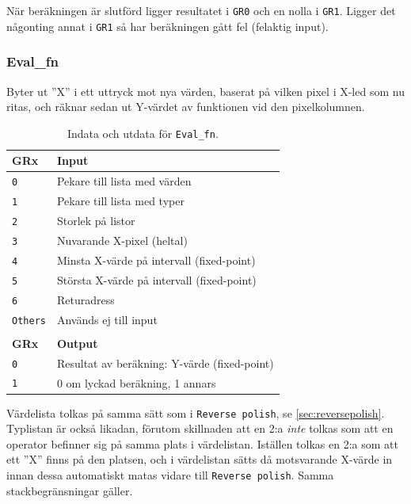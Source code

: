 \documentclass[]{article}
\begin{document}
När beräkningen är slutförd ligger resultatet i \texttt{GR0} och en nolla i \texttt{GR1}. Ligger det någonting annat i \texttt{GR1} så har beräkningen gått fel (felaktig input).

\subsubsection{Eval\_fn}
\label{sec:evalfn}

Byter ut ''X'' i ett uttryck mot nya värden, baserat på vilken pixel i X-led som nu ritas, och räknar sedan ut Y-värdet av funktionen vid den pixelkolumnen.

\begin{table}[H]
\centering
\begin{tabular}{ll}
	\textbf{GRx}    & \textbf{Input}               \\ \hline
	\texttt{0}      & Pekare till lista med värden \\
	\texttt{1}      & Pekare till lista med typer  \\
	\texttt{2}      & Storlek på listor            \\
	\texttt{3}      & Nuvarande X-pixel (heltal)   \\
	\texttt{4}      & Minsta X-värde på intervall (fixed-point) \\
	\texttt{5}      & Största X-värde på intervall (fixed-point) \\
        \texttt{6}      & Returadress                  \\
        \texttt{Others} & Används ej till input        \\
                        &                              \\
	\textbf{GRx}    & \textbf{Output}              \\ \hline
	\texttt{0}      & Resultat av beräkning: Y-värde (fixed-point) \\
	\texttt{1}      & 0 om lyckad beräkning, 1 annars
\end{tabular}
\caption{Indata och utdata för \texttt{Eval\_fn}.}
\end{table}

\noindent
Värdelista tolkas på samma sätt som i \texttt{Reverse polish}, se \ref{sec:reversepolish}. Typlistan är också likadan, förutom skillnaden att en 2:a \textit{inte} tolkas som att en operator befinner sig på samma plats i värdelistan. Iställen tolkas en 2:a som att ett ''X'' finns på den platsen, och i värdelistan sätts då motsvarande X-värde in innan dessa automatiskt matas vidare till \texttt{Reverse polish}. Samma stackbegränsningar gäller.
\end{document}

